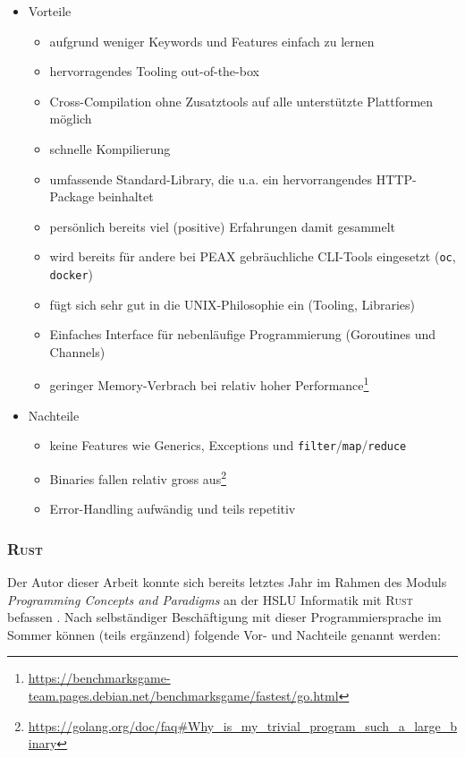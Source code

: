 \begin{itemize}
	\item Vorteile
		\begin{itemize}
			\item aufgrund weniger Keywords und Features einfach zu lernen
			\item hervorragendes Tooling out-of-the-box
			\item Cross-Compilation ohne Zusatztools auf alle unterstützte Plattformen möglich
			\item schnelle Kompilierung
			\item umfassende Standard-Library, die u.a. ein hervorrangendes HTTP-Package beinhaltet
			\item persönlich bereits viel (positive) Erfahrungen damit gesammelt
			\item wird bereits für andere bei PEAX gebräuchliche CLI-Tools eingesetzt (\texttt{oc}, \texttt{docker})
			\item fügt sich sehr gut in die UNIX-Philosophie ein (Tooling, Libraries)
			\item Einfaches Interface für nebenläufige Programmierung (Goroutines und Channels)
			\item geringer Memory-Verbrach bei relativ hoher Performance\footnote{\url{https://benchmarksgame-team.pages.debian.net/benchmarksgame/fastest/go.html}}
		\end{itemize}
	\item Nachteile
		\begin{itemize}
			\item keine Features wie Generics, Exceptions und \texttt{filter}/\texttt{map}/\texttt{reduce}
			\item Binaries fallen relativ gross aus\footnote{\url{https://golang.org/doc/faq\#Why\_is\_my\_trivial\_program\_such\_a\_large\_binary}}
			\item Error-Handling aufwändig und teils repetitiv
		\end{itemize}
\end{itemize}

\subsubsection{\textsc{Rust}}

Der Autor dieser Arbeit konnte sich bereits letztes Jahr im Rahmen des Moduls \textit{Programming Concepts and Paradigms} an der HSLU Informatik mit \textsc{Rust} befassen \cite[p. 12]{pcp-rust}. Nach selbständiger Beschäftigung mit dieser Programmiersprache im Sommer können (teils ergänzend) folgende Vor- und Nachteile genannt werden:


